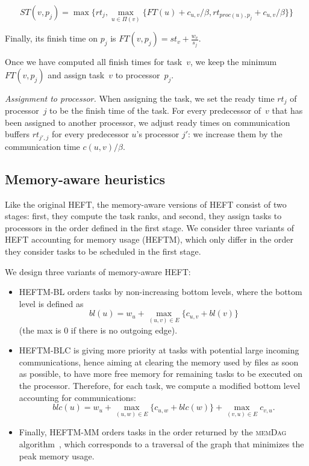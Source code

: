 \documentclass[conference]{IEEEtran}
\newcommand{\algo}[1]{\textsc{#1}}
\newcommand{\skug}[1]{{\color{blue}[SK: #1]}}
\begin{document}
 {\footnotesize{   \[ST(v, p_j) = \max{ \{rt_j, \max_{ u \in \Pi(v)}\{ FT(u)+ c_{u,v} / \beta , rt_{proc(u), p_j} + c_{u,v} / \beta  \} \} } \]}}

    Finally, its finish time on $p_j$ is
    $FT(v,p_j) = st_v + \frac{w_v}{s_j}$.

    Once we have computed all finish times for task~$v$,
    we keep the minimum $FT(v,p_j)$ and assign task~$v$
    to processor~$p_j$.

    \textit{Assignment to processor. }
    When assigning the task, we set the ready time $rt_j$ of  processor~$j$ to be the finish time of the task.
    For every predecessor of~$v$ that has been assigned to another processor, we adjust ready times on
    communication buffers $rt_{j', j}$ for every predecessor $u$'s processor $j'$: we increase them by the
    communication time $c( u,v) / \beta$.

    \subsection{Memory-aware heuristics}
    \label{sec.heftm}
    Like the original HEFT, the memory-aware versions of HEFT consist of two stages:
    first, they compute the task ranks,
    and second, they assign tasks to processors in the order defined in the first stage.
    We consider three variants of HEFT accounting for memory usage (HEFTM), which only
    differ in the order they consider tasks to be scheduled in the first stage.

\smallskip

We design three variants of memory-aware HEFT:
\begin{itemize}
\item    HEFTM-BL orders tasks by non-increasing bottom levels, where the bottom
    level is defined as
    $$bl(u) = w_u + \max_{(u,v)\in E} \{c_{u,v} + bl(v)\}$$
    (the max is 0 if there is no outgoing edge).

\item    HEFTM-BLC %
    is  giving more priority at tasks with potential large incoming communications,
    hence aiming at clearing the memory used by files as soon as possible,
    to have more free memory for remaining tasks to be executed on the processor.
    Therefore, for each task, we compute a modified bottom level accounting for communications:
    $$blc(u) = w_u + \max_{(u,w)\in E} \{c_{u,w} + blc(w)\} + \max_{(v,u)\in E} c_{v,u}   . $$


\item   Finally, HEFTM-MM orders tasks  in the order returned by %
the  \algo{memDag} algorithm~\cite{KAYAASLAN20181}, which corresponds to a traversal
of the graph that minimizes the peak memory usage.

\end{itemize}
\end{document}
